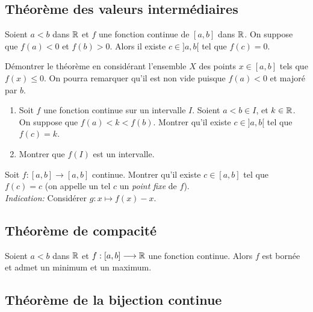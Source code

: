 \documentclass[../main.tex]{subfiles}
\begin{document}
\subsection{Théorème des valeurs intermédiaires}

\begin{thm}
    Soient $a<b$ dans $\mathbb R$ et $f$ une fonction continue de $[a,b]$ dans $\mathbb R$. On suppose que $f(a)<0$ et $f(b)>0$. Alors il existe $c\in{]a,b[}$ tel que $f(c)=0$.
\end{thm}

\begin{exo}[Démonstration, D]
	Démontrer le théorème en considérant l'ensemble $X$ des points $x\in[a,b]$ tels que $f(x)\leq 0$. On pourra remarquer qu'il est non vide puisque $f(a)<0$ et majoré par $b$.
\end{exo}

\begin{exo}[M]\leavevmode
	\begin{enumerate}
		\item Soit $f$ une fonction continue sur un intervalle $I$. Soient $a<b\in I$, et $k\in\mathbb R$. On suppose que $f(a)<k<f(b)$. Montrer qu'il existe $c\in{]a,b[}$ tel que $f(c)=k$.
		\item Montrer que $f(I)$ est un intervalle.
	\end{enumerate}
\end{exo}

\begin{exo}[M]
	Soit $f:[a,b]\longrightarrow[a,b]$ continue. Montrer qu'il existe $c\in[a,b]$ tel que $f(c)=c$ (on appelle un tel $c$ un \textit{point fixe} de $f$).\\
	\textit{Indication:} Considérer $g:x\longmapsto f(x)-x$.
\end{exo}

\subsection{Théorème de compacité}

\begin{thm}
	Soient $a<b$ dans $\mathbb R$ et $f:[a,b]\longrightarrow\mathbb R$ une fonction continue. Alors $f$ est bornée et admet un minimum et un maximum.
\end{thm}

\subsection{Théorème de la bijection continue}
\end{document}
